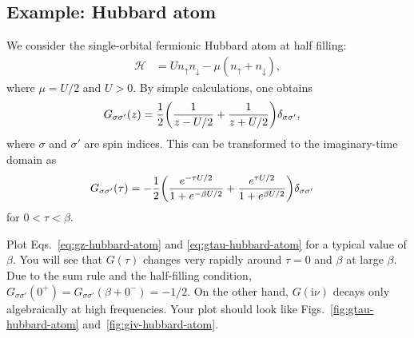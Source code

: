 \documentclass[submission, LectureNotes]{SciPost}
\newcommand\ii{\mathrm{i}}%
\newcommand\iv{\ii\nu}%
\begin{document}
\subsection{Example: Hubbard atom}
We consider the single-orbital fermionic Hubbard atom at half filling:
\begin{align}
   \mathcal{H} &= U n_\uparrow n_\downarrow - \mu (n_\uparrow + n_\downarrow),
\end{align}
where $\mu= U/2$ and $U>0$.
By simple calculations, one obtains
\begin{align}
    G_{\sigma\sigma'}(z) &= \frac{1}{2}\qty(\frac{1}{z-U/2} + \frac{1}{z+U/2})\delta_{\sigma\sigma'},\label{eq:gz-hubbard-atom}
\end{align}
where $\sigma$ and $\sigma'$ are spin indices.
This can be transformed to the imaginary-time domain as
\begin{align}
    G_{\sigma\sigma'}(\tau) &= -\frac{1}{2}
    \qty(
        \frac{e^{-\tau U/2}}{1+e^{-\beta U/2}} +
        \frac{e^{\tau U/2}}{1+e^{\beta U/2}}
    )\delta_{\sigma\sigma'}\label{eq:gtau-hubbard-atom}
\end{align}
for $0 < \tau<\beta$.

\begin{Exercise}[label=ex1]
Plot Eqs.~\eqref{eq:gz-hubbard-atom} and \eqref{eq:gtau-hubbard-atom} for a typical value of $\beta$.
You will see that $G(\tau)$ changes very rapidly around $\tau=0$ and $\beta$ at large $\beta$.
Due to the sum rule and the half-filling condition,
$G_{\sigma\sigma'}(0^+)=G_{\sigma\sigma'}(\beta+0^-) = -1/2$.
On the other hand, $G(\iv)$ decays only algebraically at high frequencies.
Your plot should look like Figs.~\ref{fig:gtau-hubbard-atom} and~\ref{fig:giv-hubbard-atom}.
\end{Exercise}
\end{document}
